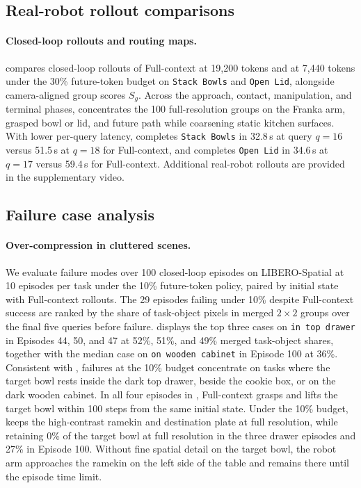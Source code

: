 \subsection{Real-robot rollout comparisons}
\label{app:supp_vis_robot}
\paragraph{Closed-loop rollouts and routing maps.}
     compares closed-loop rollouts of Full-context at 19,200 tokens and \method at 7,440 tokens under the 30\% future-token budget on \texttt{Stack Bowls} and \texttt{Open Lid}, alongside camera-aligned group scores $S_g$.
    Across the approach, contact, manipulation, and terminal phases, \method concentrates the 100 full-resolution groups on the Franka arm, grasped bowl or lid, and future path while coarsening static kitchen surfaces.
    With lower per-query latency, \method completes \texttt{Stack Bowls} in 32.8\,s at query $q=16$ versus 51.5\,s at $q=18$ for Full-context, and completes \texttt{Open Lid} in 34.6\,s at $q=17$ versus 59.4\,s for Full-context.
    Additional real-robot rollouts are provided in the supplementary video.

\subsection{Failure case analysis}
\label{app:supp_failures}

\paragraph{Over-compression in cluttered scenes.}
    We evaluate failure modes over 100 closed-loop episodes on LIBERO-Spatial at 10 episodes per task under the 10\% future-token policy, paired by initial state with Full-context rollouts.
    The 29 episodes failing under 10\% \method despite Full-context success are ranked by the share of task-object pixels in merged $2\times 2$ groups over the final five queries before failure.
     displays the top three cases on \texttt{in top drawer} in Episodes 44, 50, and 47 at 52\%, 51\%, and 49\% merged task-object shares, together with the median case on \texttt{on wooden cabinet} in Episode 100 at 36\%.
    Consistent with , failures at the 10\% budget concentrate on tasks where the target bowl rests inside the dark top drawer, beside the cookie box, or on the dark wooden cabinet.
    In all four episodes in , Full-context grasps and lifts the target bowl within 100 steps from the same initial state.
    Under the 10\% budget, \method keeps the high-contrast ramekin and destination plate at full resolution, while retaining 0\% of the target bowl at full resolution in the three drawer episodes and 27\% in Episode 100.
    Without fine spatial detail on the target bowl, the robot arm approaches the ramekin on the left side of the table and remains there until the episode time limit.

